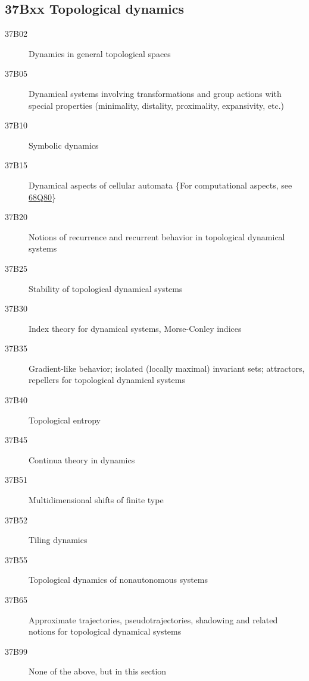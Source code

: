 \subsection*{37Bxx  Topological dynamics  }\label{37Bxx}
\begin{description}  
\item [37B02]\label{37B02} Dynamics in general topological spaces 
\item [37B05]\label{37B05} Dynamical systems involving transformations and group actions with special properties (minimality, distality, proximality, expansivity, etc.)
\item [37B10]\label{37B10} Symbolic dynamics 
\item [37B15]\label{37B15} Dynamical aspects of cellular automata  \{For computational aspects, see  \hyperref[68Q80]{68Q80}\}
\item [37B20]\label{37B20} Notions of recurrence and recurrent behavior in topological dynamical systems
\item [37B25]\label{37B25} Stability of topological dynamical systems
\item [37B30]\label{37B30} Index theory for dynamical systems, Morse-Conley indices 
\item [37B35]\label{37B35} Gradient-like behavior; isolated (locally maximal) invariant sets; attractors, repellers for topological dynamical systems
\item [37B40]\label{37B40} Topological entropy 
\item [37B45]\label{37B45} Continua theory in dynamics
\item [37B51]\label{37B51} Multidimensional shifts of finite type  
\item [37B52]\label{37B52} Tiling dynamics
\item [37B55]\label{37B55} Topological dynamics of nonautonomous systems
\item [37B65]\label{37B65} Approximate trajectories, pseudotrajectories, shadowing and related notions for topological dynamical systems
\item [37B99]\label{37B99} None of the above, but in this section
\end{description}
